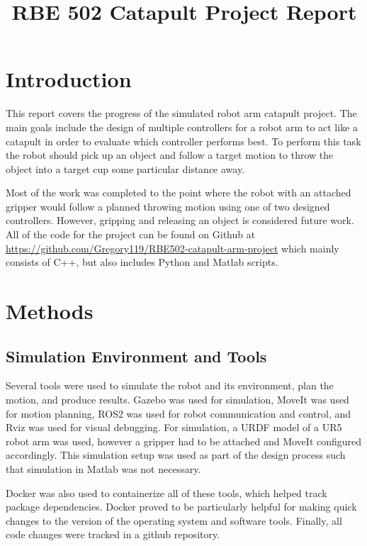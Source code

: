 \documentclass[conference]{IEEEtran}
\begin{document}
\title{RBE 502 Catapult Project Report}

\author{
}

\maketitle


\section{Introduction}
This report covers the progress of the simulated robot arm catapult project. The
main goals include the design of multiple controllers for a robot arm to act
like a catapult in order to evaluate which controller performs best. To perform
this task the robot should pick up an object and follow a target motion to throw
the object into a target cup some particular distance away.

Most of the work was completed to the point where the robot with an attached
gripper would follow a planned throwing motion using one of two designed
controllers. However, gripping and releasing an object is considered future
work. All of the code for the project can be found on Github at
\url{https://github.com/Gregory119/RBE502-catapult-arm-project} which mainly
consists of C++, but also includes Python and Matlab scripts.

\section{Methods}

\subsection{Simulation Environment and Tools}
Several tools were used to simulate the robot and its environment, plan the
motion, and produce results. Gazebo was used for simulation, MoveIt was used for
motion planning, ROS2 was used for robot communication and control, and Rviz was
used for visual debugging. For simulation, a URDF model of a UR5 robot arm was
used, however a gripper had to be attached and MoveIt configured
accordingly. This simulation setup was used as part of the design process such
that simulation in Matlab was not necessary.

Docker was also used to containerize all of these tools, which helped track
package dependencies. Docker proved to be particularly helpful for making quick
changes to the version of the operating system and software tools. Finally, all
code changes were tracked in a github repository.
\end{document}
